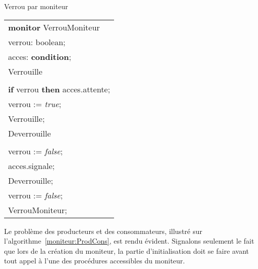 \begin{algorithm}[!htb]
\caption{Verrou par moniteur}\label{moniteur:exempleVerrou}
\centering
\begin{tabular}{l}
{\bf monitor} VerrouMoniteur \\
\hspace{0.3cm}{\bf var} verrou: boolean; \\
\hspace{0.3cm}{\bf var} acces: {\bf condition}; \\

\hspace{0.3cm}{\bf entry procedure} Verrouille \\
\hspace{0.6cm}{\bf begin} \\
\hspace{1cm} {\bf if} verrou {\bf then} acces.attente; \\
\hspace{1cm} verrou := {\em true}; \\
\hspace{0.6cm}{\bf end} Verrouille; \\

\hspace{0.3cm}{\bf entry procedure} Deverrouille \\
\hspace{0.6cm}{\bf begin} \\
\hspace{1cm}verrou := {\em false}; \\
\hspace{1cm}acces.signale; \\
\hspace{0.6cm}{\bf end} Deverrouille; \\

\hspace{0.3cm}{\bf begin} verrou := {\em false}; \\
\hspace{0.3cm}{\bf end} VerrouMoniteur;
\end{tabular}

\end{algorithm}
\par
Le problème des producteurs et des consommateurs, illustré sur l'algorithme~\ref{moniteur:ProdCons}, est rendu évident. Signalons seulement le fait que lors de la création du moniteur, la partie d'initialisation doit se faire avant tout appel à l'une des procédures accessibles du moniteur.
